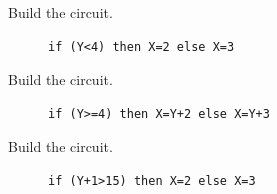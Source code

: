 

\begin{description}

\item[Build the circuit.]
\begin{verbatim}
if (Y<4) then X=2 else X=3
\end{verbatim}
\vspace{1in}

\item[Build the circuit.]
\begin{verbatim}
if (Y>=4) then X=Y+2 else X=Y+3
\end{verbatim}
\vspace{1in}

\item[Build the circuit.]
\begin{verbatim}
if (Y+1>15) then X=2 else X=3
\end{verbatim}


\end{description}
